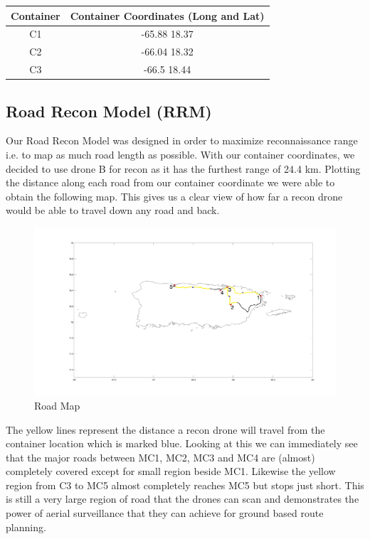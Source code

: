 \documentclass[a4paper,12pt]{article}
\begin{document}
\begin{center}
\begin{tabular}{ |c|c| }
 \hline
 Container & Container Coordinates (Long and Lat) \\\hline
  C1 & -65.88 18.37 \\
  C2 & -66.04 18.32  \\
  C3 & -66.5 18.44  \\
 \hline
\end{tabular}
\end{center}

\subsection{Road Recon Model (RRM)}
Our Road Recon Model was designed in order to maximize reconnaissance range i.e. to map as much road length as possible.
With our container coordinates, we decided to use drone B for recon as it has the furthest range of 24.4 km.
Plotting the distance along each road from our container coordinate we were able to obtain the following map. This gives us a clear view of how far
a recon drone would be able to travel down any road and back.
\newpage

\begin{figure}[t]
\centering
\includegraphics[scale =0.18]{NewRoadNoCircles}
\caption{Road Map}
\label{road-approx}
\end{figure}

The yellow lines represent the distance a recon drone will travel from the container location which is marked blue. Looking at this we can immediately see that the major roads
between MC1, MC2, MC3 and MC4 are (almost) completely covered except for small region beside MC1.
Likewise the yellow region from C3 to MC5 almost completely reaches MC5 but stops just short. This is still a very large region of road that the drones can scan
and demonstrates the power of aerial surveillance that they can achieve for ground based route planning.
\end{document}
